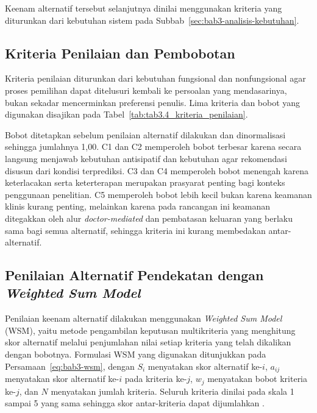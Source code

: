 Keenam alternatif tersebut selanjutnya dinilai menggunakan kriteria yang diturunkan dari kebutuhan sistem pada Subbab~\ref{sec:bab3-analisis-kebutuhan}.

\subsection{Kriteria Penilaian dan Pembobotan}
\label{subsec:bab3-kriteria-penilaian-pembobotan}

Kriteria penilaian diturunkan dari kebutuhan fungsional dan nonfungsional agar proses pemilihan dapat ditelusuri kembali ke persoalan yang mendasarinya, bukan sekadar
mencerminkan preferensi penulis. Lima kriteria dan bobot yang digunakan disajikan pada Tabel~\ref{tab:tab3.4_kriteria_penilaian}.



Bobot ditetapkan sebelum penilaian alternatif dilakukan dan dinormalisasi sehingga jumlahnya 1,00. C1 dan C2 memperoleh bobot terbesar karena secara langsung menjawab kebutuhan
antisipatif dan kebutuhan agar rekomendasi disusun dari kondisi terprediksi. C3 dan C4 memperoleh bobot menengah karena keterlacakan serta keterterapan merupakan prasyarat penting 
bagi konteks penggunaan penelitian. C5 memperoleh bobot lebih kecil bukan karena keamanan klinis kurang penting, melainkan karena pada rancangan ini keamanan ditegakkan oleh alur \textit{doctor-mediated}
dan pembatasan keluaran yang berlaku sama bagi semua alternatif, sehingga kriteria ini kurang membedakan antar-alternatif.

\subsection{Penilaian Alternatif Pendekatan dengan \textit{Weighted Sum Model}}
\label{subsec:bab3-penilaian-wsm}

Penilaian keenam alternatif dilakukan menggunakan \textit{Weighted Sum Model} (WSM), yaitu metode pengambilan keputusan multikriteria yang menghitung skor alternatif melalui penjumlahan
nilai setiap kriteria yang telah dikalikan dengan bobotnya. Formulasi WSM yang digunakan ditunjukkan pada Persamaan~\ref{eq:bab3-wsm}, dengan $S_i$ menyatakan skor alternatif
ke-$i$, $a_{ij}$ menyatakan skor alternatif ke-$i$ pada kriteria ke-$j$, $w_j$ menyatakan bobot kriteria ke-$j$, dan $N$ menyatakan jumlah kriteria. Seluruh kriteria dinilai pada
skala 1 sampai 5 yang sama sehingga skor antar-kriteria dapat dijumlahkan \parencite{triantaphyllou1989}.

